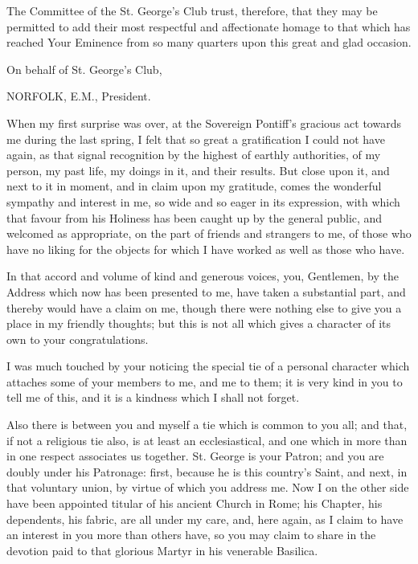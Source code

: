 The Committee of the St. George's Club trust, therefore, that they
may be permitted to add their most respectful and affectionate homage
to that which has reached Your Eminence from so many quarters upon
this great and glad occasion.

On behalf of St. George's Club,

NORFOLK, E.M., President.


When my first surprise was over, at the Sovereign Pontiff's
gracious act towards me during the last spring, I felt that so great a
gratification I could not have again, as that signal recognition by
the highest of earthly authorities, of my person, my past life, my
doings in it, and their results. But close upon it, and next to it in
moment, and in claim upon my gratitude, comes the wonderful sympathy
and interest in me, so wide and so eager in its expression, with which
that favour from his Holiness has been caught up by the general
public, and welcomed as appropriate, on the part of friends and
strangers to me, of those who have no liking for the objects for which
I have worked as well as those who have.

In that accord and volume of kind and generous voices, you,
Gentlemen, by the Address which now has been presented to me, have
taken a substantial part, and thereby would have a claim on me, though
there were nothing else to give you a place in my friendly thoughts;
but this is not all which gives a character of its own to your
congratulations.

I was much touched by your noticing the special tie of a personal
character which attaches some of your members to me, and me to them;
it is very kind in you to tell me of this, and it is a kindness which
I shall not forget.

Also there is between you and myself a tie which is common to you
all; and that, if not a religious tie also, is at least an
ecclesiastical, and one which in more than in one respect associates
us together. St. George is your Patron; and you are doubly under his
Patronage: first, because he is this country's Saint, and next, in
that voluntary union, by virtue of which you address me. Now I on the
other side have been appointed titular of his ancient Church in Rome;
his Chapter, his dependents, his fabric, are all under my care,
and, here again, as I claim to have an interest in you more than
others have, so you may claim to share in the devotion paid to that
glorious Martyr in his venerable Basilica.

